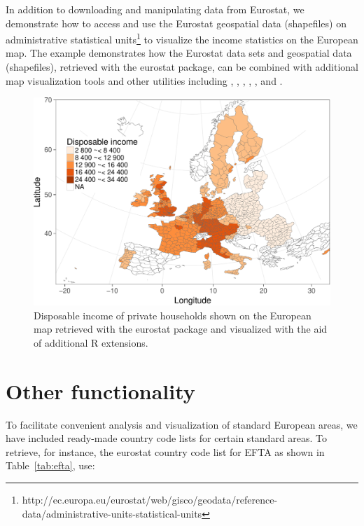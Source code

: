 In addition to downloading and manipulating data from Eurostat, we
demonstrate how to access and use the Eurostat geospatial data
(shapefiles) on administrative statistical
units\footnote{http://ec.europa.eu/eurostat/web/gisco/geodata/reference-data/administrative-units-statistical-units}
to visualize the income statistics on the European map. The example
demonstrates how the Eurostat data sets and geospatial data
(shapefiles), retrieved with the eurostat package, can be combined
with additional map visualization tools and other utilities including
 \citep{grid},  \citep{maptools},  \citep{rgdal},
 \citep{rgeos},  \citep{scales}, and
 \citep{stringr}.


\begin{figure}
\begin{center}
\includegraphics{2015-manu-mapexample-1}
\caption{Disposable income of private households shown on the European map retrieved with the eurostat package and visualized with the aid of additional R extensions.}
\label{fig:mapexample}
\end{center}
\end{figure}




\section{Other functionality}

To facilitate convenient analysis and visualization of standard
European areas, we have included ready-made country code lists for
certain standard areas. To retrieve, for instance, the eurostat
country code list for EFTA as shown in Table~\ref{tab:efta}, use:

